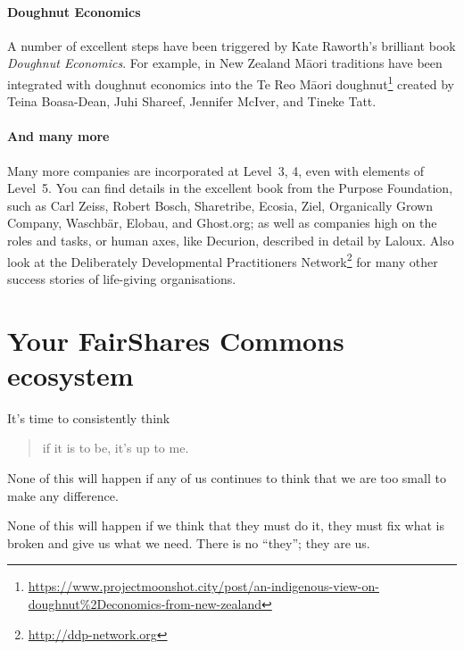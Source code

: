 \paragraph{Doughnut Economics}  A number of excellent steps have been triggered by Kate Raworth’s  brilliant book \emph{Doughnut Economics}\cite{raworth-doughnut}. For example, in New Zealand M\=aori traditions have been integrated with doughnut economics into the Te Reo M\=aori doughnut\footnote{\url{https://www.projectmoonshot.city/post/an-indigenous-view-on-doughnut\%2Deconomics-from-new-zealand}} created by Teina Boasa-Dean,  Juhi Shareef,   Jennifer McIver,  and Tineke Tatt.


\paragraph{And many more} Many more companies are incorporated at Level~3, 4, even with elements of Level~5. You can find details in the excellent book from the Purpose Foundation\cite{purpose-foundation}, such as Carl Zeiss, Robert Bosch, Sharetribe, Ecosia, Ziel, Organically Grown Company, Waschb{\"a}r, Elobau, and Ghost.org; as well as companies high on the roles and tasks, or human axes, like Decurion, described in detail by Laloux\cite{laloux-RO}. Also look at the Deliberately Developmental Practitioners Network\footnote{\url{http://ddp-network.org}} for many other success stories of life-giving organisations.


\section{Your FairShares Commons ecosystem}
\label{section:create-join-ecosystem}


It's time to consistently think \begin{quote} if it is to be, it's up to me. \end{quote}


None of this will happen if any of us continues to think that we are too small to make any difference. 


None of this will happen if we think that they must do it, they must fix what is broken and give us what we need. There is no “they”; they are us.



